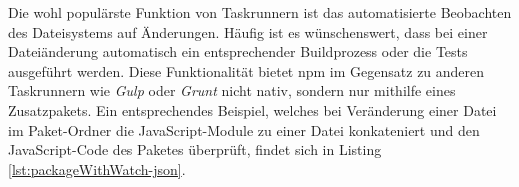 \begin{figure}[H]
	
\end{figure}

Die wohl populärste Funktion von Taskrunnern ist das automatisierte Beobachten des Dateisystems auf Änderungen. Häufig ist es wünschenswert, dass bei einer Dateiänderung automatisch ein entsprechender Buildprozess oder die Tests ausgeführt werden. Diese Funktionalität bietet npm im Gegensatz zu anderen Taskrunnern wie \textit{Gulp} oder \textit{Grunt} nicht nativ, sondern nur mithilfe eines Zusatzpakets. Ein entsprechendes Beispiel, welches bei Veränderung einer Datei im Paket-Ordner die JavaScript-Module zu einer Datei konkateniert \cite{browserify-about} und den JavaScript-Code des Paketes überprüft, findet sich in Listing \ref{lst:packageWithWatch-json}. \cite{cirkel-npmAsABuildTool}

\begin{figure}[H]
	
\end{figure}